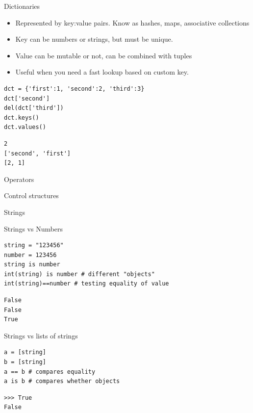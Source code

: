 \documentclass[presentation]{beamer}
\begin{document}
\begin{frame}[fragile,label=sec-4-1-12]{Dictionaries}
 \begin{itemize}
\item Represented by key:value pairs. Know as hashes, maps, associative collections
\item Key can be numbers or strings, but must be unique.
\item Value can be mutable or not, can be combined with tuples
\item Useful when you need a fast lookup based on custom key.
\end{itemize}

\lstset{numbers=left,language=Python,label= ,caption= }
\begin{lstlisting}
dct = {'first':1, 'second':2, 'third':3}
dct['second']
del(dct['third'])
dct.keys()
dct.values()
\end{lstlisting}

\lstset{numbers=left,language=Python,label= ,caption= }
\begin{lstlisting}
2
['second', 'first']
[2, 1]
\end{lstlisting}
\end{frame}


\begin{frame}[label=sec-4-1-13]{Operators}
\end{frame}


\begin{frame}[label=sec-4-1-14]{Control structures}
\end{frame}


\begin{frame}[fragile,label=sec-4-1-15]{Strings}
 \begin{block}{Strings vs Numbers}
\lstset{numbers=left,language=Python,label= ,caption= }
\begin{lstlisting}
string = "123456"
number = 123456 
string is number
int(string) is number # different "objects"
int(string)==number # testing equality of value
\end{lstlisting}

\lstset{numbers=left,language=Python,label= ,caption= }
\begin{lstlisting}
False
False
True
\end{lstlisting}
\end{block}


\begin{block}{Strings vs lists of strings}
\lstset{numbers=left,language=Python,label= ,caption= }
\begin{lstlisting}
a = [string]
b = [string]
a == b # compares equality
a is b # compares whether objects
\end{lstlisting}

\lstset{numbers=left,language=Python,label= ,caption= }
\begin{lstlisting}
>>> True
False
\end{lstlisting}
\end{block}
\end{frame}
\end{document}
